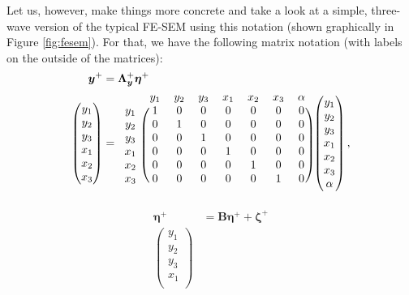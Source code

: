 \documentclass[
  12pt,
  a4paper]{article}
\begin{document}
Let us, however, make things more concrete and take a look at a simple,
three-wave version of the typical FE-SEM using this notation (shown
graphically in Figure \ref{fig:fesem}). For that, we have the following
matrix notation (with labels on the outside of the matrices):
\begin{align}
\begin{split}
\bm{y}^{+} & = \bm{\Lambda_{y}}^{+}\bm{\eta}^{+} \\
\begin{pmatrix}
y_{1} \\
y_{2} \\
y_{3} \\
x_{1} \\
x_{2} \\
x_{3}
\end{pmatrix} & = 
\begin{blockarray}{cccccccc}
 & y_{1} & y_{2} & y_{3} & x_{1} & x_{2} & x_{3} & \alpha \\
 \begin{block}{c(ccccccc)}
 y_{1} & 1 & 0 & 0 & 0 & 0 & 0 & 0 \\
 y_{2} & 0 & 1 & 0 & 0 & 0 & 0 & 0 \\
 y_{3} & 0 & 0 & 1 & 0 & 0 & 0 & 0 \\ 
 x_{1} & 0 & 0 & 0 & 1 & 0 & 0 & 0 \\
 x_{2} & 0 & 0 & 0 & 0 & 1 & 0 & 0 \\
 x_{3} & 0 & 0 & 0 & 0 & 0 & 1 & 0 \\
 \end{block}
\end{blockarray}
\begin{pmatrix}
y_{1} \\
y_{2} \\
y_{3} \\
x_{1} \\
x_{2} \\
x_{3} \\
\alpha
\end{pmatrix},
\end{split} \label{eq:y}
\end{align} \begin{align}
\begin{split}
\bm{\eta}^{+} & = \bm{B}\bm{\eta}^{+} + \bm{\zeta}^{+} \\
\begin{pmatrix}
y_{1} \\
y_{2} \\
y_{3} \\
x_{1} \\

\end{pmatrix}
\end{split}
\end{align}
\end{document}
